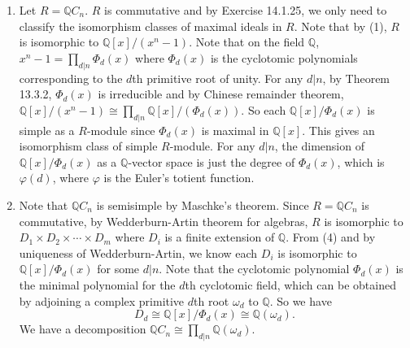 \documentclass[a4paper, 12pt]{article}
\begin{document}
\begin{solution}
\begin{enumerate}[(1)]
\item Let \(R=\mathbb{Q}C_n\). \(R\) is commutative and by Exercise 14.1.25, we only need to classify the isomorphism classes of maximal ideals in \(R\). Note that by (1), \(R\) is isomorphic to 
\(\mathbb{Q}[x]/(x^n-1)\). Note that on the field \(\mathbb{Q}\), \(x^n-1=\prod_{d|n} \Phi_d(x)\) where \(\Phi_d(x)\) is the cyclotomic polynomials corresponding to the \(d\)th primitive root of unity. For any \(d|n\), by Theorem 13.3.2, \(\Phi_d(x)\) is 
irreducible and by Chinese remainder theorem, \(\mathbb{Q}[x]/(x^n-1)\cong \prod_{d|n}\mathbb{Q}[x]/(\Phi_d(x))\). So each \(\mathbb{Q}[x]/\Phi_d(x)\) is simple as a \(R\)-module since \(\Phi_d(x)\) is maximal in \(\mathbb{Q}[x]\). This gives 
an isomorphism class of simple \(R\)-module. For any \(d|n\), the dimension of \(\mathbb{Q}[x]/\Phi_d(x)\) as a \(\mathbb{Q}\)-vector space is just the degree of \(\Phi_d(x)\), which is \(\varphi(d)\), where \(\varphi\) is the Euler's totient function. 
\item Note that \(\mathbb{Q}C_n\) is semisimple by Maschke's theorem.  Since \(R=\mathbb{Q}C_n\) is commutative, by Wedderburn-Artin theorem for algebras, \(R\) is isomorphic to \(D_1\times D_2\times\cdots\times D_m\) where \(D_i\) is a finite extension of \(\mathbb{Q}\). From (4) and by uniqueness of Wedderburn-Artin, we know each \(D_i\) is isomorphic to 
\(\mathbb{Q}[x]/\Phi_d(x)\) for some \(d|n\). Note that the cyclotomic polynomial \(\Phi_d(x)\) is the minimal polynomial for the \(d\)th cyclotomic field, which can be obtained by adjoining a complex primitive \(d\)th root \(\omega_d\) to \(\mathbb{Q}\). So we have 
\[D_d\cong \mathbb{Q}[x]/\Phi_d(x)\cong \mathbb{Q}(\omega_d).\]
We have a decomposition \(\mathbb{Q}C_n\cong \prod_{d|n} \mathbb{Q}(\omega_d)\).
\end{enumerate}
\end{solution}
\end{document}
